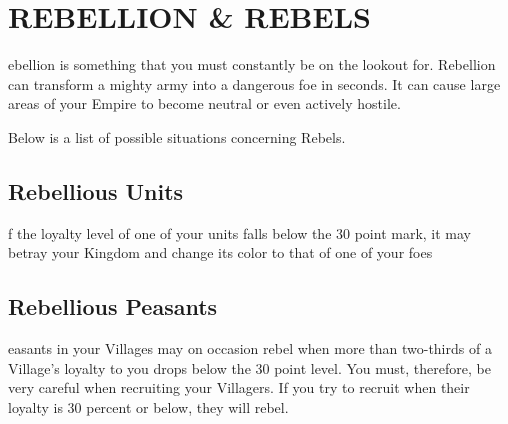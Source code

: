 
\chapter[Rebellion and Rebels]{{\Huge R}EBELLION {\Huge \&} {\Huge R}EBELS}

ebellion is something that you must constantly be on the lookout for. Rebellion can transform a mighty army into a dangerous foe in seconds. It can cause large areas of your Empire to become neutral or even actively hostile.

Below is a list of possible situations concerning Rebels.

\section{\textsf{Rebellious Units}}


f the loyalty level of one of your units falls below the 30 point mark, it may betray your Kingdom and change its color to that of one of your foes

\section{\textsf{Rebellious Peasants}}


easants in your Villages may on occasion rebel when more than two-thirds of a Village’s loyalty to you drops below the 30 point level. You must, therefore, be very careful when recruiting your Villagers. If you try to recruit when their loyalty is 30 percent or below, they will rebel.

